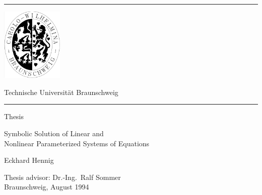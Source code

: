 \documentclass[11pt]{report}           %
\begin{document}

\pagestyle{empty}
\begin{titlepage}
\setcounter{page}{-1}
\hrule

\vspace{5mm}
\noindent
\begin{minipage}[t]{3.5cm}
\rule{0pt}{0pt}

\includegraphics[height=3.5cm]{TUBS1.png}

\vspace{6mm}
\end{minipage}
\hfill
\begin{minipage}[t]{12.4cm}
\begin{center}
\tu 

\vspace{0.5ex}
Technische Universit\"at Braunschweig\\[1cm]
\end{center}
\end{minipage}
\hrule

\vspace{2cm}

\begin{center}
\LARGE
Thesis

\vspace{2cm}

\huge Symbolic Solution of Linear and\\
Nonlinear Parameterized Systems of Equations

\vspace{2cm}
\LARGE Eckhard Hennig

\vspace{4cm}
\Large Thesis advisor: Dr.-Ing.\ Ralf Sommer\\[\baselineskip]
Braunschweig, August 1994
\end{center}

\end{titlepage}
\thispagestyle{empty}
\end{document}

